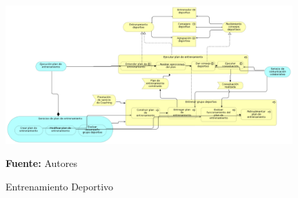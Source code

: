 \begin{figure}[!htb]
  \begin{center}
    \includegraphics[width=11cm]{./imagenes/business_process/entrenamientodeportivo.png}
    \caption{Entrenamiento Deportivo}
    \label{fig:bp_entrenamiento_deportivo}
    \textbf{Fuente:}  Autores
  \end{center}
\end{figure}

